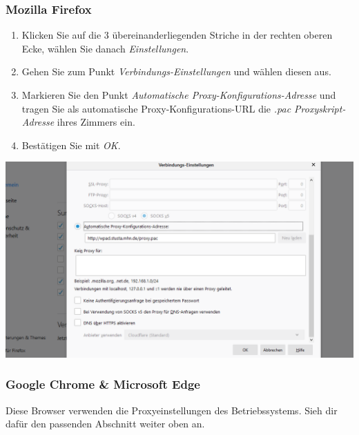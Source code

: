 \documentclass[a4paper,12pt]{scrartcl}
\begin{document}
\subsubsection*{Mozilla Firefox}

\begin{minipage}{0.57\textwidth}
\begin{enumerate}
	\item Klicken Sie auf die 3 übereinanderliegenden Striche in der rechten oberen Ecke, wählen Sie danach \emph{Einstellungen}.
	\item Gehen Sie zum Punkt \emph{Verbindungs-Einstellungen} und wählen diesen aus.
	\item Markieren Sie den Punkt \emph{Automatische Proxy-Konfigurations-Adresse} und tragen Sie als automatische Proxy-Konfigurations-URL die \textit{.pac Proxyskript-Adresse} ihres Zimmers ein.
	\item Bestätigen Sie mit \textit{OK}.
\end{enumerate}
\end{minipage}
\hfill
\begin{minipage}{0.4\textwidth}
\centering
\includegraphics[width=\linewidth,keepaspectratio]{Bilder/Firefox_neu_proxy}
\end{minipage}

\subsubsection*{Google Chrome \& Microsoft Edge}
Diese Browser verwenden die Proxyeinstellungen des Betriebssystems.
Sieh dir dafür den passenden Abschnitt weiter oben an.
\end{document}
